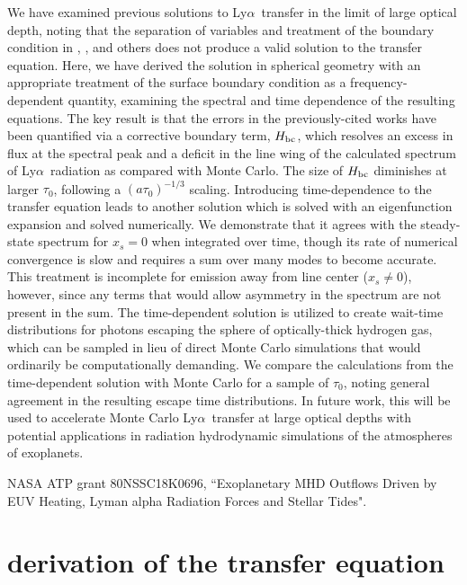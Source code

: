 \documentclass{aastex63}
\newcommand\lya{Ly$\alpha$\ }
\begin{document}
We have examined previous solutions to \lya transfer in the limit of large optical depth, noting that the separation of variables and treatment of the boundary condition in \cite{1973MNRAS.162...43H}, \cite{1990ApJ...350..216N}, \cite{2006ApJ...649...14D} and others does not produce a valid solution to the transfer equation. Here, we have derived the solution in spherical geometry with an appropriate treatment of the surface boundary condition as a frequency-dependent quantity, examining the spectral and time dependence of the resulting equations. The key result is that the errors in the previously-cited works have been quantified via a corrective boundary term, $H_{\rm bc}$, which resolves an excess in flux at the spectral peak and a deficit in the line wing of the calculated spectrum of \lya radiation as compared with Monte Carlo. The size of $H_{\rm bc}$ diminishes at larger $\tau_0$, following a $(a\tau_0)^{-1/3}$ scaling. Introducing time-dependence to the transfer equation leads to another solution which is solved with an eigenfunction expansion and solved numerically. We demonstrate that it agrees with the steady-state spectrum for $x_s=0$ when integrated over time, though its rate of numerical convergence is slow and requires a sum over many modes to become accurate. This treatment is incomplete for emission away from line center ($x_s\neq0$), however, since any terms that would allow asymmetry in the spectrum are not present in the sum. The time-dependent solution is utilized to create wait-time distributions for photons escaping the sphere of optically-thick hydrogen gas, which can be sampled in lieu of direct Monte Carlo simulations that would ordinarily be computationally demanding. We compare the calculations from the time-dependent solution with Monte Carlo for a sample of $\tau_0$, noting general agreement in the resulting escape time distributions. In future work, this will be used to accelerate Monte Carlo \lya transfer at large optical depths with potential applications in radiation hydrodynamic simulations of the atmospheres of exoplanets.

\acknowledgments

NASA ATP grant 80NSSC18K0696, ``Exoplanetary MHD Outflows Driven by EUV Heating, Lyman alpha Radiation Forces and Stellar Tides".
\restartappendixnumbering

\appendix
\section{ derivation of the transfer equation } \label{app:rteqn_derivation}
\end{document}
